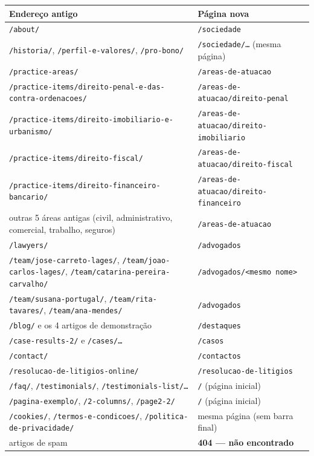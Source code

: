 \documentclass[11pt,a4paper]{article}
\begin{document}
\begin{center}\footnotesize
\renewcommand{\arraystretch}{1.1}
\begin{longtable}{@{}>{\raggedright\arraybackslash}p{8.4cm}>{\raggedright\arraybackslash}p{6.4cm}@{}}
\toprule
\textbf{Endereço antigo} & \textbf{Página nova} \\ \midrule
\endhead
\texttt{/about/} & \texttt{/sociedade} \\
\texttt{/historia/}, \texttt{/perfil-e-valores/}, \texttt{/pro-bono/} & \texttt{/sociedade/\ldots} (mesma página) \\
\texttt{/practice-areas/} & \texttt{/areas-de-atuacao} \\
\nolinkurl{/practice-items/direito-penal-e-das-contra-ordenacoes/} & \texttt{/areas-de-atuacao/direito-penal} \\
\texttt{/practice-items/direito-imobiliario-e-urbanismo/} & \texttt{/areas-de-atuacao/direito-imobiliario} \\
\texttt{/practice-items/direito-fiscal/} & \texttt{/areas-de-atuacao/direito-fiscal} \\
\texttt{/practice-items/direito-financeiro-bancario/} & \texttt{/areas-de-atuacao/direito-financeiro} \\
outras 5 áreas antigas (civil, administrativo, comercial, trabalho, seguros) & \texttt{/areas-de-atuacao} \\
\texttt{/lawyers/} & \texttt{/advogados} \\
\texttt{/team/jose-carreto-lages/}, \texttt{/team/joao-carlos-lages/}, \texttt{/team/catarina-pereira-carvalho/} & \texttt{/advogados/<mesmo nome>} \\
\texttt{/team/susana-portugal/}, \texttt{/team/rita-tavares/}, \texttt{/team/ana-mendes/} & \texttt{/advogados} \\
\texttt{/blog/} e os 4 artigos de demonstração & \texttt{/destaques} \\
\texttt{/case-results-2/} e \texttt{/cases/\ldots} & \texttt{/casos} \\
\texttt{/contact/} & \texttt{/contactos} \\
\texttt{/resolucao-de-litigios-online/} & \texttt{/resolucao-de-litigios} \\
\texttt{/faq/}, \texttt{/testimonials/}, \texttt{/testimonials-list/\ldots} & \texttt{/} (página inicial) \\
\texttt{/pagina-exemplo/}, \texttt{/2-columns/}, \texttt{/page2-2/} & \texttt{/} (página inicial) \\
\texttt{/cookies/}, \texttt{/termos-e-condicoes/}, \texttt{/politica-de-privacidade/} & mesma página (sem barra final) \\
5 artigos de spam & \textbf{404 --- não encontrado} \\
\bottomrule
\end{longtable}
\end{center}
\end{document}
